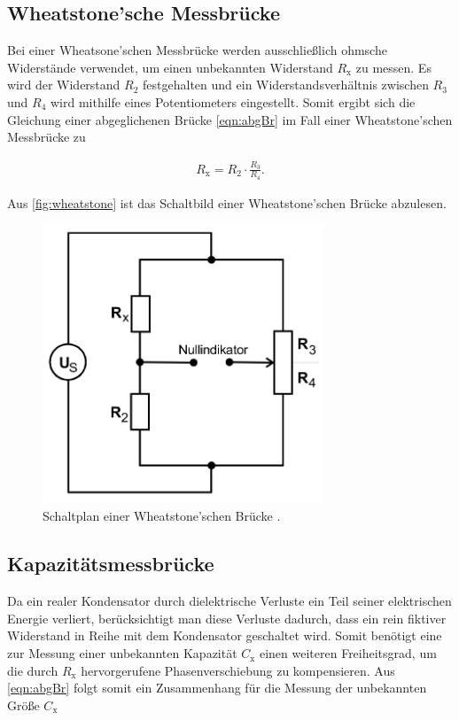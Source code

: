 \subsection{Wheatstone'sche Messbrücke}
Bei einer Wheatsone'schen Messbrücke werden ausschließlich ohmsche Widerstände verwendet, um einen unbekannten Widerstand 
$R_{\text{x}}$ zu messen. Es wird der Widerstand $R_2$ festgehalten und ein Widerstandsverhältnis zwischen 
$R_3$ und $R_4$ wird mithilfe eines Potentiometers eingestellt. Somit ergibt sich die Gleichung einer abgeglichenen Brücke 
\ref{eqn:abgBr} im Fall einer Wheatstone'schen Messbrücke zu

\begin{align}
    R_{\text{x}} = R_2 \cdot \frac{R_3}{R_4}.
    \label{eqn:wheatstoneGleichung}
\end{align}

Aus \autoref{fig:wheatstone} ist das Schaltbild einer Wheatstone'schen Brücke abzulesen.

\begin{figure}[H]
    \centering
    \includegraphics[width=0.75\textwidth]{dateien/wheatstoneBruecke.png}
    \caption{Schaltplan einer Wheatstone'schen Brücke \cite{anleitung}.}
    \label{fig:wheatstone}
\end{figure}


\subsection{Kapazitätsmessbrücke}
Da ein realer Kondensator durch dielektrische Verluste ein Teil seiner elektrischen Energie verliert, berücksichtigt
man diese Verluste dadurch, dass ein rein fiktiver Widerstand in Reihe mit dem Kondensator geschaltet wird.
Somit benötigt eine zur Messung einer unbekannten Kapazität $C_{\text{x}}$ einen weiteren Freiheitsgrad, um
die durch $R_{\text{x}}$ hervorgerufene Phasenverschiebung zu kompensieren. 
Aus \autoref{eqn:abgBr} folgt somit ein Zusammenhang für die Messung der unbekannten Größe $C_{\text{x}}$

